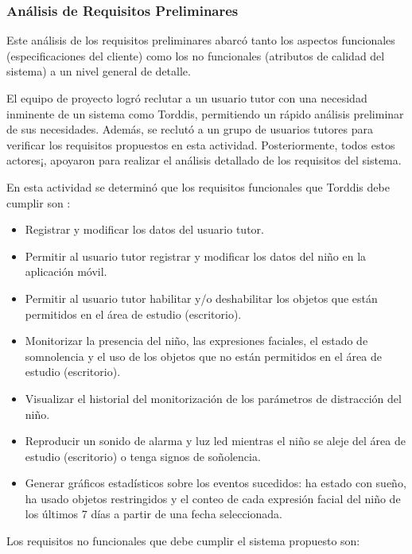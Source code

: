 \documentclass[a4paper,fleqn]{cas-sc}
\begin{document}
			\subsubsection{Análisis de Requisitos Preliminares}
				Este análisis de los requisitos preliminares abarcó tanto los aspectos funcionales (especificaciones del cliente) como los no funcionales (atributos de calidad del sistema) a un nivel general de detalle.
				
				El equipo de proyecto logró reclutar a un usuario tutor con una necesidad inminente de un sistema como Torddis, permitiendo un rápido análisis preliminar de sus necesidades. Además, se reclutó a un grupo de usuarios tutores para verificar los requisitos propuestos en esta actividad. Posteriormente, todos estos actores¡, apoyaron para realizar el análisis detallado de los requisitos del sistema.
				
				En esta actividad se determinó que los requisitos funcionales que Torddis debe cumplir son \cite{Asish2022Detecting,Pabba2022AnIntelligent,Vettivel2018System}:%
				 
				\begin{itemize}
					\item Registrar y modificar los datos del usuario tutor.
					\item Permitir al usuario tutor registrar y modificar los datos del niño en la aplicación móvil.
					\item Permitir al usuario tutor habilitar y/o deshabilitar los objetos que están permitidos en el área de estudio (escritorio).
					\item Monitorizar la presencia del niño, las expresiones faciales, el estado de somnolencia y el uso de los objetos que no están permitidos en el área de estudio (escritorio).
					\item Visualizar el historial del monitorización de los parámetros de distracción del niño.
					\item Reproducir un sonido de alarma y luz led mientras el niño se aleje del área de estudio (escritorio) o tenga signos de soñolencia.
					\item Generar gráficos estadísticos sobre los eventos sucedidos: ha estado con sueño, ha usado objetos restringidos y el conteo de cada expresión facial del niño de los últimos 7 días a partir de una fecha seleccionada.
				\end{itemize}
				
				Los requisitos no funcionales que debe cumplir el sistema propuesto son:
				
\end{document}
